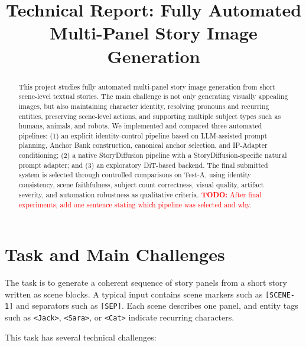\documentclass[11pt,a4paper]{article}
\title{Technical Report: Fully Automated Multi-Panel Story Image Generation}
\author{\todo{Team name / author names}}
\date{\todo{Date}}
\newcommand{\todo}[1]{\textcolor{red}{\textbf{TODO:} #1}}
\begin{document}
\maketitle

\begin{abstract}
This project studies fully automated multi-panel story image generation from short scene-level textual stories. The main challenge is not only generating visually appealing images, but also maintaining character identity, resolving pronouns and recurring entities, preserving scene-level actions, and supporting multiple subject types such as humans, animals, and robots. We implemented and compared three automated pipelines: (1) an explicit identity-control pipeline based on LLM-assisted prompt planning, Anchor Bank construction, canonical anchor selection, and IP-Adapter conditioning; (2) a native StoryDiffusion pipeline with a StoryDiffusion-specific natural prompt adapter; and (3) an exploratory DiT-based backend. The final submitted system is selected through controlled comparisons on Test-A, using identity consistency, scene faithfulness, subject count correctness, visual quality, artifact severity, and automation robustness as qualitative criteria. \todo{After final experiments, add one sentence stating which pipeline was selected and why.}
\end{abstract}

\section{Task and Main Challenges}

The task is to generate a coherent sequence of story panels from a short story written as scene blocks. A typical input contains scene markers such as \texttt{[SCENE-1]} and separators such as \texttt{[SEP]}. Each scene describes one panel, and entity tags such as \texttt{<Jack>}, \texttt{<Sara>}, or \texttt{<Cat>} indicate recurring characters.

This task has several technical challenges:
\end{document}
